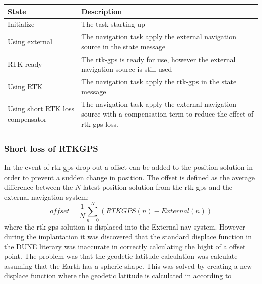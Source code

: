 \begin{table}
\begin{tabular}{ | p{3cm} | p{8cm} |}
	\hline 
	\textbf{State}						& \textbf{Description} \\ \hline
	Initialize							& The task starting up\\ \hline
	Using external						& The navigation task apply the external navigation source in the state message\\ \hline
	RTK ready							& The \gls{rtk-gps} is ready for use, however the external navigation source is still used\\ \hline
	Using RTK							& The navigation task apply the \gls{rtk-gps} in the state message\\ \hline
	Using short RTK loss compensator	& The navigation task apply the external navigation source with a compensation term to reduce the effect of \gls{rtk-gps} loss. \\ \hline
\end{tabular}
\end{table}
\subsubsection{Short loss of RTKGPS}\label{ss:ShortLoss}
In the event of \gls{rtk-gps} drop out a offset can be added to the position solution in order to prevent a sudden change in position. The offset is defined as the average difference between the $N$ latest position solution from the \gls{rtk-gps} and the external navigation system:
\begin{equation}
offset = \frac{1}{N}\sum_{n=0}^N(RTKGPS(n)-External(n))
\end{equation}
where the \gls{rtk-gps} solution is displaced into the External nav system. However during the implantation it was discovered that the standard displace function in the DUNE literary was inaccurate in correctly calculating the hight of a offset point. The problem was that the geodetic latitude calculation was calculate assuming that the Earth has a spheric shape. This was solved by creating a new displace function where the geodetic latitude is calculated in according to